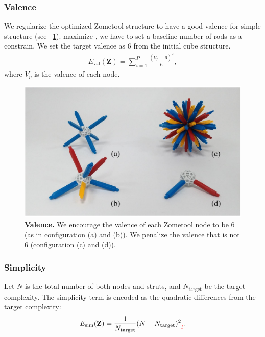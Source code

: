 \subsubsection{Valence}
We regularize the optimized Zometool structure to have a good valence for  simple structure (see \figname~\ref{fig:Valence}). 
 maximize , we have to set a baseline number of rods as a constrain.
We set the target valence as $6$ from the initial cube structure.
\begin{align}
E_{\text{val}}(\mathbf{Z}) = \sum_{i=1}^{P} \frac{(V_p-6)^2}{6},
\end{align}
where $V_p$ is the valence of each node.

\begin{figure}[ht]
\centering
\includegraphics[width=1.0\linewidth]{figs/Valence.pdf} 
\caption{\textbf{Valence.} We encourage the valence of each Zometool node to be 6 (as in configuration (a) and (b)). 
We penalize the valence that is not 6 (configuration (c) and (d)).
}
\label{fig:Valence}
\end{figure}

\subsubsection{Simplicity}
Let $N$ is the total number of both nodes and struts, and $N_\text{target}$ be the target complexity.
The simplicity term is encoded as the quadratic differences from the target complexity:
\begin{align}
E_{\text{sim}}(\mathbf{Z}) = \frac{1}{N_{\text{target}}}(N-N_{\text{target}})^2\chireplace{,}{.}
\end{align}


